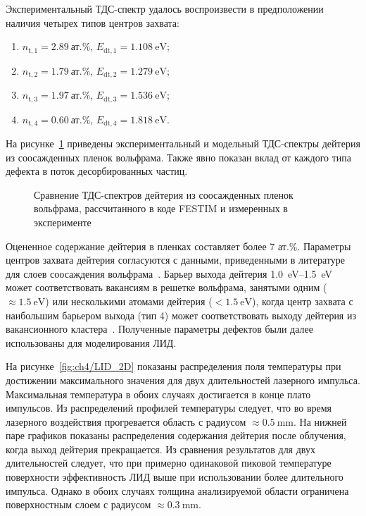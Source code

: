 Экспериментальный ТДС-спектр удалось воспроизвести в предположении наличия четырех типов центров захвата:
\begin{enumerate}[beginpenalty=10000]
    \item \( n_\mathrm{t,1}=\SI{2.89}{\text{ат.}\percent} \), \( E_\mathrm{dt,1}=\SI{1.108}{\electronvolt} \);
    \item \( n_\mathrm{t,2}=\SI{1.79}{\text{ат.}\percent} \), \( E_\mathrm{dt,2}=\SI{1.279}{\electronvolt} \);
    \item \( n_\mathrm{t,3}=\SI{1.97}{\text{ат.}\percent} \), \( E_\mathrm{dt,3}=\SI{1.536}{\electronvolt} \);
    \item \( n_\mathrm{t,4}=\SI{0.60}{\text{ат.}\percent} \), \( E_\mathrm{dt,4}=\SI{1.818}{\electronvolt} \).
\end{enumerate}
На рисунке~\cref{fig:ch4/LID_TDS} приведены экспериментальный и модельный ТДС-спектры дейтерия из соосажденных пленок вольфрама. Также явно показан вклад от каждого типа дефекта в поток десорбированных частиц.

\begin{figure}[ht]
    \caption{Сравнение ТДС-спектров дейтерия из соосажденных пленок вольфрама, рассчитанного в коде FESTIM и измеренных в эксперименте}\label{fig:ch4/LID_TDS}
\end{figure}

Оцененное содержание дейтерия в пленках составляет более 7 ат.\%. Параметры центров захвата дейтерия согласуются с данными, приведенными в литературе для слоев соосаждения вольфрама~\cite{Krat2018}. Барьер выхода дейтерия \SIrange{1.0}{1.5}{\electronvolt} может соответствовать вакансиям в решетке вольфрама, занятыми одним (\(\approx\SI{1.5}{\electronvolt}\)) или несколькими атомами дейтерия (\(<\SI{1.5}{\electronvolt}\)), когда центр захвата с наибольшим барьером выхода (тип 4) может соответствовать выходу дейтерия из вакансионного кластера~\cite{Ogorodnikova2015}. Полученные параметры дефектов были далее использованы для моделирования ЛИД.

На рисунке~\cref{fig:ch4/LID_2D} показаны распределения поля температуры при достижении максимального значения для двух длительностей лазерного импульса. Максимальная температура в обоих случаях достигается в конце плато импульсов. Из распределений профилей температуры следует, что во время лазерного воздействия прогревается область с радиусом \( \approx \SI{0.5}{\milli\meter} \). На нижней паре графиков показаны распределения содержания дейтерия после облучения, когда выход дейтерия прекращается. Из сравнения результатов для двух длительностей следует, что при примерно одинаковой пиковой температуре поверхности эффективность ЛИД выше при использовании более длительного импульса. Однако в обоих случаях толщина анализируемой области ограничена поверхностным слоем с радиусом \(\approx\SI{0.3}{\milli\meter}\).

